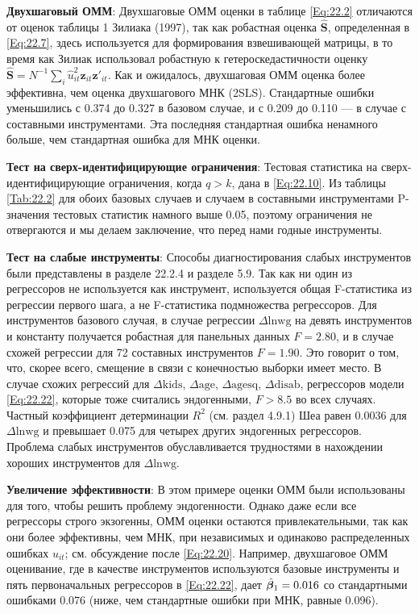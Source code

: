 \textbf{Двухшаговый ОММ}:  Двухшаговые ОММ оценки в таблице \ref{Eq:22.2} отличаются от оценок таблицы 1 Зилиака (1997), так как робастная оценка $\hat{\mathbf S}$, определенная в   \ref{Eq:22.7}, здесь используется для формирования взвешивающей матрицы, в то время как Зилиак использовал робастную к гетероскедастичности оценку $\hat{\mathbf S}=N^{-1} \sum_i\hat{u}^2_{it} \mathbf z_{it} \mathbf z'_{it}$. Как и ожидалось, двухшаговая ОММ оценка более эффективна, чем оценка двухшагового МНК (2SLS). Стандартные ошибки уменьшились с 0.374 до 0.327 в базовом случае, и с 0.209 до 0.110 --- в случае с составными инструментами. Эта последняя стандартная ошибка ненамного больше, чем стандартная ошибка для МНК оценки.

\textbf{Тест на сверх-идентифицирующие ограничения}: Тестовая статистика на сверх-идентифицирующие ограничения, когда $q >k$, дана в \ref{Eq:22.10}. Из таблицы \ref{Tab:22.2} для обоих базовых случаев и случаем в составными инструментами P-значения тестовых статистик намного выше 0.05, поэтому ограничения не отвергаются и мы делаем заключение, что перед нами годные инструменты. 

\textbf{Тест на слабые инструменты}: Способы диагностирования слабых инструментов были представлены  в разделе 22.2.4 и разделе 5.9. Так как ни один из регрессоров не используется как инструмент, используется общая F-статистика из регрессии первого шага, а не F-статистика подмножества регрессоров. Для инструментов базового случая, в случае регрессии $\Delta \mathrm{lnwg}$ на девять инструментов и константу получается робастная для панельных данных $F=2.80$, и в случае схожей регрессии для 72 составных инструментов  $F=1.90$. Это говорит о том, что, скорее всего, смещение в связи с конечностью выборки имеет место. В случае схожих регрессий для $\Delta \mathrm{kids}$, $\Delta \mathrm{age}$, $\Delta \mathrm{agesq}$, $\Delta \mathrm{disab}$, регрессоров модели \ref{Eq:22.22}, которые тоже считались эндогенными, $F > 8.5$  во всех случаях. Частный коэффициент детерминации $R^2$ (см. раздел 4.9.1) Шеа равен 0.0036 для $\Delta \mathrm{lnwg}$ и превышает 0.075 для  четырех других эндогенных регрессоров. Проблема слабых инструментов обуславливается трудностями в нахождении хороших инструментов для $\Delta \mathrm{lnwg}$.

\textbf{Увеличение эффективности}: В этом примере оценки ОММ были использованы для того, чтобы решить проблему эндогенности. Однако даже если все регрессоры строго экзогенны, ОММ оценки остаются привлекательными, так как они более эффективны, чем МНК, при независимых и одинаково распределенных ошибках $u_{it}$; см. обсуждение после \ref{Eq:22.20}. Например, двухшаговое ОММ оценивание, где в качестве инструментов используются базовые инструменты и пять первоначальных регрессоров в \ref{Eq:22.22}, дает $\hat{\bm{\beta}}_1=0.016$ со стандартными ошибками 0.076 (ниже, чем стандартные ошибки при МНК, равные 0.096).

